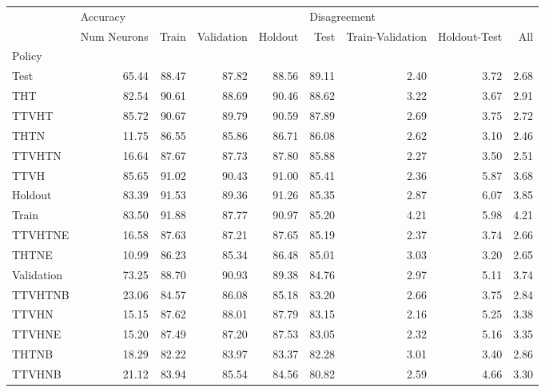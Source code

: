 \begin{table}
\centering
\label{tab:policy_metrics}
\begin{tabular}{lrrrrrrrr}
\toprule
{} & \multicolumn{4}{l}{Accuracy} & \multicolumn{3}{l}{Disagreement} \\
{} & Num Neurons &    Train & Validation & Holdout &   Test & Train-Validation & Holdout-Test &   All \\
Policy     &             &          &            &         &        &                  &              &       \\
\midrule
Test       &       65.44 &    88.47 &      87.82 &   88.56 &  89.11 &             2.40 &         3.72 &  2.68 \\
THT        &       82.54 &    90.61 &      88.69 &   90.46 &  88.62 &             3.22 &         3.67 &  2.91 \\
TTVHT      &       85.72 &    90.67 &      89.79 &   90.59 &  87.89 &             2.69 &         3.75 &  2.72 \\
THTN       &       11.75 &    86.55 &      85.86 &   86.71 &  86.08 &             2.62 &         3.10 &  2.46 \\
TTVHTN     &       16.64 &    87.67 &      87.73 &   87.80 &  85.88 &             2.27 &         3.50 &  2.51 \\
TTVH       &       85.65 &    91.02 &      90.43 &   91.00 &  85.41 &             2.36 &         5.87 &  3.68 \\
Holdout    &       83.39 &    91.53 &      89.36 &   91.26 &  85.35 &             2.87 &         6.07 &  3.85 \\
Train      &       83.50 &    91.88 &      87.77 &   90.97 &  85.20 &             4.21 &         5.98 &  4.21 \\
TTVHTNE    &       16.58 &    87.63 &      87.21 &   87.65 &  85.19 &             2.37 &         3.74 &  2.66 \\
THTNE      &       10.99 &    86.23 &      85.34 &   86.48 &  85.01 &             3.03 &         3.20 &  2.65 \\
Validation &       73.25 &    88.70 &      90.93 &   89.38 &  84.76 &             2.97 &         5.11 &  3.74 \\
TTVHTNB    &       23.06 &    84.57 &      86.08 &   85.18 &  83.20 &             2.66 &         3.75 &  2.84 \\
TTVHN      &       15.15 &    87.62 &      88.01 &   87.79 &  83.15 &             2.16 &         5.25 &  3.38 \\
TTVHNE     &       15.20 &    87.49 &      87.20 &   87.53 &  83.05 &             2.32 &         5.16 &  3.35 \\
THTNB      &       18.29 &    82.22 &      83.97 &   83.37 &  82.28 &             3.01 &         3.40 &  2.86 \\
TTVHNB     &       21.12 &    83.94 &      85.54 &   84.56 &  80.82 &             2.59 &         4.66 &  3.30 \\
\bottomrule
\end{tabular}
\end{table}
